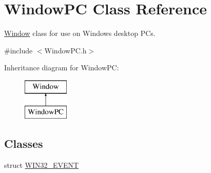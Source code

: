 \hypertarget{class_window_p_c}{}\section{Window\+PC Class Reference}
\label{class_window_p_c}


\hyperlink{class_window}{Window} class for use on Windows desktop P\+Cs.  




{\ttfamily \#include $<$Window\+P\+C.\+h$>$}

Inheritance diagram for Window\+PC\+:\begin{figure}[H]
\begin{center}
\leavevmode
\includegraphics[height=2.000000cm]{class_window_p_c}
\end{center}
\end{figure}
\subsection*{Classes}
\begin{DoxyCompactItemize}
\item 
struct \hyperlink{struct_window_p_c_1_1_w_i_n32___e_v_e_n_t}{W\+I\+N32\+\_\+\+E\+V\+E\+NT}
\end{DoxyCompactItemize}
